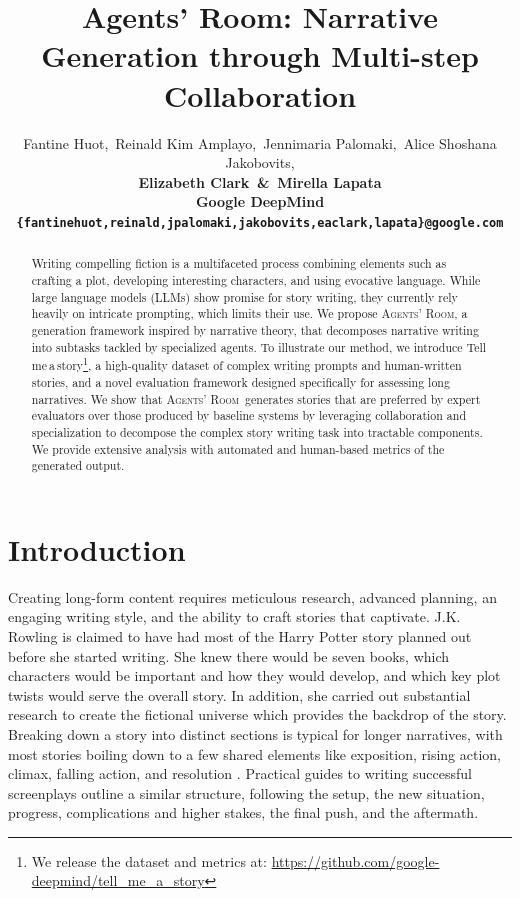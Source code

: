 \documentclass{article}
\title{Agents' Room:  Narrative Generation through Multi-step Collaboration}
\author{\vspace{0.08cm}Fantine Huot,\, Reinald Kim Amplayo,\, Jennimaria Palomaki,\, Alice Shoshana Jakobovits, \\
\vspace{0.08cm}
\bf{Elizabeth Clark\, \&\, Mirella Lapata} \\
\vspace{0.08cm}
Google DeepMind \\
\small{\texttt{\{fantinehuot,reinald,jpalomaki,jakobovits,eaclark,lapata\}@google.com}}
}
\newcommand{\Agentsroom}{\textsc{Agents' Room}}
\newcommand{\tellmeastory}{{\sc Tell$\,$me$\,$a$\,$story}}
\newcommand{\mirella}[1]{{\textcolor{cyan}{\bf{Mirella:} \emph{#1}}}}
\begin{document}
\maketitle

\begin{abstract}
Writing compelling fiction is a multifaceted process combining
elements such as crafting a plot, developing interesting characters,
and using evocative language. While large language models (LLMs) show
promise for story writing, they currently rely heavily on intricate
prompting, which limits their use. We propose \Agentsroom, a
generation framework inspired by narrative theory, that decomposes
narrative writing into subtasks tackled by specialized agents. To
illustrate our method, we introduce \tellmeastory\footnote{We release
the dataset and metrics at: \small{\url{https://github.com/google-deepmind/tell_me_a_story}}}, a high-quality dataset of complex writing prompts and human-written stories, and a novel  evaluation framework designed specifically for assessing long narratives. We show that \Agentsroom\ generates stories that are preferred by expert evaluators over those produced by baseline systems by  leveraging  collaboration and specialization to decompose the complex story writing task into tractable components. We provide extensive analysis with automated and human-based metrics of the generated output. 
\end{abstract}

\section{Introduction}



Creating long-form content requires meticulous research, advanced
planning, an engaging writing style, and the ability to craft stories
that captivate.  J.K. Rowling is claimed to have had most of the Harry
Potter story planned out before she started writing.  She knew there
would be seven books, which characters would be important and how they
would develop, and which key plot twists would serve the overall
story. In addition, she carried out substantial research to create the
fictional universe which provides the backdrop of the story. Breaking
down a story into distinct sections is typical for longer narratives,
with most stories boiling down to a few shared elements like
exposition, rising action, climax, falling action, and resolution
\citep{freytag1896freytag,pavis1998dictionary}. Practical guides to
writing successful screenplays \citep{cutting2016narrative,Hauge:2017}
outline a similar structure, following the setup, the new situation,
progress, complications and higher stakes, the final push, and the
aftermath.
\end{document}
